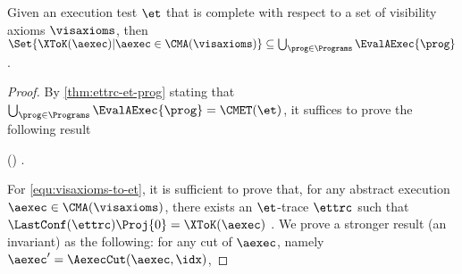 \begin{toappendix}
\label{sec:proof-et-completeness}
\end{toappendix}
\begin{theoremrep}
\label{thm:et-complete}
Given an execution test \(\et\) that is complete with respect to a set of visibility axioms \(\visaxioms\),
then \(\Set{\XToK(\aexec) | \aexec \in \CMA(\visaxioms)} \subseteq \bigcup_{\prog \in \Programs} \EvalAExec{\prog}\).
\end{theoremrep}
\begin{proof}
By \cref{thm:ettrc-et-prog} stating that \( \bigcup_{\prog \in \Programs}  \EvalAExec{\prog} = \CMET(\et)\),
it suffices to prove the following result
\begin{Formulae}
\begin{Formula}
    \Set{\XToK(\aexec) | \aexec \in \CMA(\visaxioms) } \subseteq \CMET(\et) .
    \label{equ:visaxioms-to-et}
\end{Formula}
\end{Formulae}
For \cref{equ:visaxioms-to-et}, it is sufficient to prove that,
for any abstract execution \( \aexec \in \CMA(\visaxioms) \),
there exists an \(\et\)-trace \( \ettrc \) such that \( \LastConf(\ettrc)\Proj{0} =  \XToK(\aexec)  \) .
We prove a stronger result (an invariant) as the following:
for any cut of \( \aexec \), namely \( \aexec' = \AexecCut(\aexec,\idx) \),

\end{proof}
